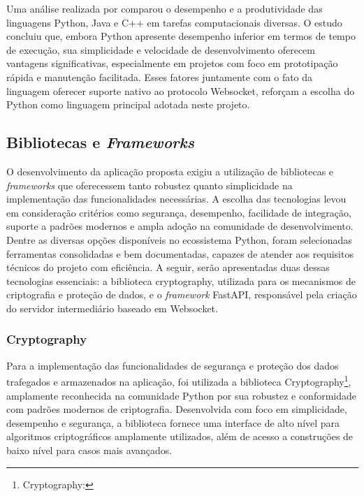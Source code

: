 Uma análise realizada por 
comparou o desempenho e a produtividade das linguagens Python, Java e
C++ em tarefas computacionais diversas. O estudo concluiu que, embora
Python apresente desempenho inferior em termos de tempo de execução,
sua simplicidade e velocidade de desenvolvimento oferecem vantagens
significativas, especialmente em projetos com foco em prototipação
rápida e manutenção facilitada. Esses fatores juntamente com o fato
da linguagem oferecer suporte nativo ao protocolo Websocket, reforçam
a escolha do Python como linguagem principal adotada neste projeto.

\subsection{Bibliotecas e \textit{Frameworks}}

O desenvolvimento da aplicação proposta exigiu a utilização de
bibliotecas e \textit{frameworks} que oferecessem tanto robustez quanto
simplicidade na implementação das funcionalidades necessárias. A
escolha das tecnologias levou em consideração critérios como
segurança, desempenho, facilidade de integração, suporte a padrões
modernos e ampla adoção na comunidade de desenvolvimento. Dentre as
diversas opções disponíveis no ecossistema Python, foram selecionadas
ferramentas consolidadas e bem documentadas, capazes de atender aos
requisitos técnicos do projeto com eficiência. A seguir, serão
apresentadas duas dessas tecnologias essenciais: a biblioteca
cryptography, utilizada para os mecanismos de criptografia e proteção
de dados, e o \textit{framework} FastAPI, responsável pela criação do servidor
intermediário baseado em Websocket.

\subsubsection{Cryptography}

Para a implementação das funcionalidades de segurança e proteção dos
dados trafegados e armazenados na aplicação, foi utilizada a
biblioteca Cryptography\footnote{Cryptography:
}, amplamente reconhecida na
comunidade Python
por sua robustez e conformidade com padrões modernos de criptografia.
Desenvolvida com foco em simplicidade, desempenho e segurança, a
biblioteca fornece uma interface de alto nível para algoritmos
criptográficos amplamente utilizados, além de acesso a construções de
baixo nível para casos mais avançados.

